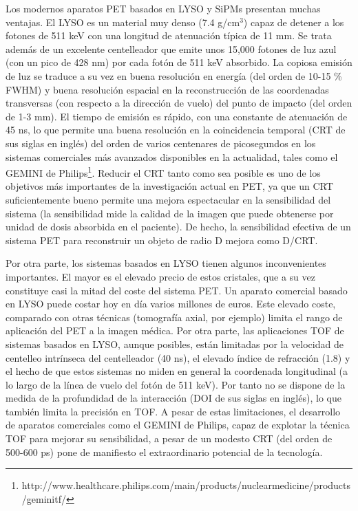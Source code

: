 Los modernos aparatos PET basados en LYSO y SiPMs presentan muchas ventajas. El LYSO es un material muy denso (7.4 g/cm$^3$) capaz de detener a los fotones de 511 keV con una longitud de atenuación típica de 11 mm. Se trata además de un excelente centelleador que emite unos 15,000 fotones de luz azul (con un pico de 428 nm) por cada fotón de 511 keV absorbido. La copiosa emisión de luz se traduce a su vez en buena resolución en energía (del orden de 10-15 \% FWHM) y buena resolución espacial en la reconstrucción de las coordenadas transversas (con respecto a la dirección de vuelo) del punto de impacto (del orden de 1-3 mm). El tiempo de emisión es rápido, con una constante de atenuación de 45 ns, lo que permite una buena resolución en la coincidencia temporal (CRT de sus siglas en inglés) del orden de varios centenares de picosegundos en los sistemas comerciales más avanzados disponibles en la actualidad, tales como el GEMINI de Philips\footnote{http://www.healthcare.philips.com/main/products/nuclearmedicine/products/geminitf/}. Reducir el CRT tanto como sea posible es uno de los objetivos más importantes de la investigación actual en PET, ya que un CRT suficientemente bueno permite una mejora espectacular en la sensibilidad del sistema (la sensibilidad mide la calidad de la imagen que puede obtenerse por unidad de dosis absorbida en el paciente).  De hecho, la sensibilidad efectiva de un sistema PET para reconstruir un objeto de radio D mejora como D/CRT. 

Por otra parte, los sistemas basados en LYSO tienen algunos inconvenientes importantes. El mayor es el elevado precio de estos cristales, que a su vez constituye casi la mitad del coste del sistema PET. Un aparato comercial basado en LYSO puede costar hoy en día varios millones de euros. Este elevado coste, comparado con otras técnicas (tomografía axial, por ejemplo) limita el rango de aplicación del PET a la imagen médica. Por otra parte, las aplicaciones TOF de sistemas basados en LYSO, aunque posibles, están limitadas por la velocidad de centelleo intrínseca del centelleador (40 ns), el elevado índice de refracción (1.8)  y el hecho de que estos sistemas no miden en general la coordenada longitudinal (a lo largo de la línea de vuelo del fotón de 511 keV). Por tanto no se dispone de la medida de la profundidad de la interacción (DOI de sus siglas en inglés), lo que también limita la precisión en TOF. A pesar de estas limitaciones, el desarrollo de aparatos comerciales como el GEMINI de Philips, capaz de explotar la técnica TOF para mejorar su sensibilidad, a pesar de un modesto CRT (del orden de 500-600 ps) pone de manifiesto el extraordinario potencial de la tecnología.

